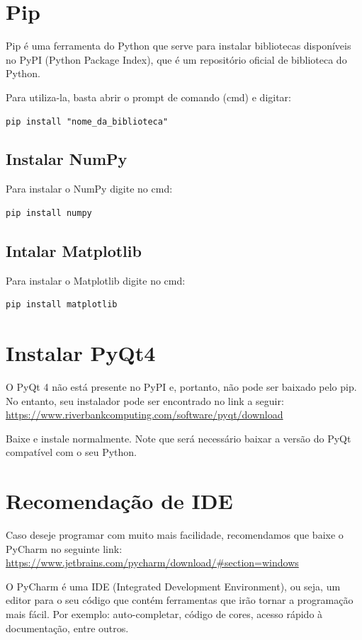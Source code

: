 \documentclass[presentation]{beamer}
\begin{document}
\section{Pip}
\label{sec:orgheadline17}
Pip é uma ferramenta do Python que serve para instalar bibliotecas disponíveis no PyPI (Python Package Index), que é um repositório oficial de biblioteca do Python.

Para utiliza-la, basta abrir o prompt de comando (cmd) e digitar:
\begin{verbatim}
pip install "nome_da_biblioteca"
\end{verbatim}

\subsection{Instalar NumPy}
\label{sec:orgheadline15}
Para instalar o NumPy digite no cmd:
\begin{verbatim}
pip install numpy
\end{verbatim}

\subsection{Intalar Matplotlib}
\label{sec:orgheadline16}
Para instalar o Matplotlib digite no cmd:
\begin{verbatim}
pip install matplotlib
\end{verbatim}

\section{Instalar PyQt4}
\label{sec:orgheadline18}
O PyQt 4 não está presente no PyPI e, portanto, não pode ser baixado pelo pip. No entanto, seu instalador pode ser  encontrado no link a seguir: \url{https://www.riverbankcomputing.com/software/pyqt/download}

Baixe e instale normalmente. Note que será necessário baixar a versão do PyQt compatível com o seu Python.
\section{Recomendação de IDE}
\label{sec:orgheadline19}
Caso deseje programar com muito mais facilidade, recomendamos que baixe o PyCharm no seguinte link: \url{https://www.jetbrains.com/pycharm/download/#section=windows}

O PyCharm é uma IDE (Integrated Development Environment), ou seja, um editor para o seu código que contém ferramentas que irão tornar a programação mais fácil. Por exemplo: auto-completar, código de cores, acesso rápido à documentação, entre outros.
\end{document}
